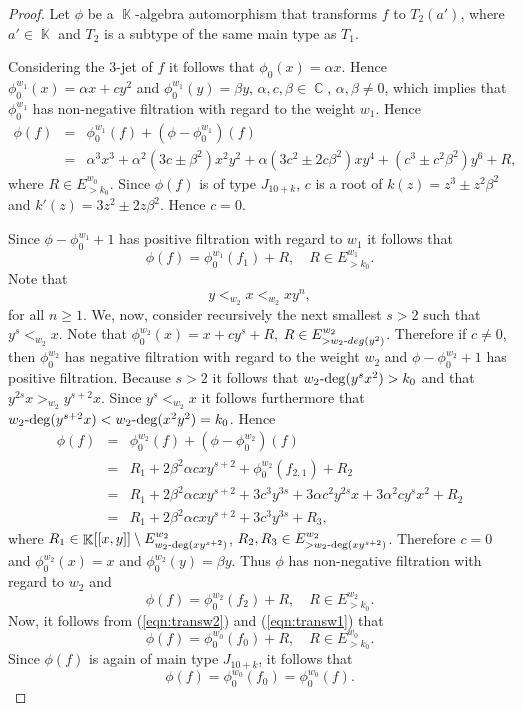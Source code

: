 \documentclass[noend]{amsproc}
\theoremstyle{definition}
\DeclareMathOperator{\C}{\mathbb{C}}
\DeclareMathOperator{\K}{\mathbb{K}}
\DeclareMathOperator{\dash}{\!\textnormal{-}\!}
\begin{document}
\begin{proof}
Let $\phi$ be a $\K$-algebra automorphism that transforms $f$ to $T_2(a')$,
where $a'\in\K$ and $T_2$ is a subtype of the same main type as $T_1$.

Considering the $3$-jet of $f$ it follows that $\phi_0(x)=\alpha x$. Hence
$\phi_0^{w_1}(x)=\alpha x+cy^2$ and $\phi_0^{w_1}(y)=\beta y$,
$\alpha,c,\beta\in\C$, $\alpha,\beta\neq 0$, which implies that $\phi^{w_1}_0$
has non-negative filtration with regard to the weight $w_1$. Hence
\begin{eqnarray*}
\phi(f)&=&\phi^{w_1}_0(f)+(\phi-\phi^{w_1}_0)(f)\\
&=&\alpha^3x^3+\alpha^2(3c\pm\beta^2)x^2y^2+\alpha(3c^2\pm2 c\beta^2)xy^4
+(c^3\pm c^2\beta^2)y^6+R,
\end{eqnarray*}
where $R\in E^{w_0}_{>k_0}$. Since $\phi(f)$ is of type $J_{10+k}$, $c$ is a
root of $k(z)=z^3\pm z^2\beta^2$ and $k'(z)=3z^2\pm2 z\beta^2$. Hence $c=0$.

Since $\phi-\phi_0^{w_1}+1$ has positive filtration with regard to $w_1$ it
follows that
\begin{equation}\label{eqn:transw2}
\phi(f) = \phi_0^{w_1}(f_1) + R,\quad R\in E^{w_1}_{>k_0}.
\end{equation}
Note that
\begin{equation}\label{eqn:orderw1}
y<_{w_2}x<_{w_2}xy^n,
\end{equation}
for all $n\ge 1$. We, now, consider recursively the next smallest $s>2$ such
that $y^s<_{w_2}x$. Note that $\phi_0^{w_2}(x)=x+cy^s+R$,
$R\in E^{w_2}_{>w_2\dash deg(y^2)}$. Therefore if $c\neq 0$, then
$\phi_0^{w_2}$ has negative filtration with regard to the weight $w_2$ and
$\phi-\phi_0^{w_2}+1$ has positive filtration. Because $s>2$ it follows that
$w_2\dash\deg(y^sx^2)>k_0$ and that $y^{2s}x>_{w_2}y^{s+2}x$. Since
$y^s<_{w_2}x$ it follows furthermore that
$w_2\dash\deg(y^{s+2}x)<w_2\dash\deg(x^2y^2)=k_0$. Hence
\begin{eqnarray*}
\phi(f) &=& \phi_0^{w_2}(f)+(\phi-\phi_0^{w_2})(f)\\
&=& R_1+2\beta^2\alpha c xy^{s+2}+\phi_0^{w_2}(f_{2,1})+R_2\\
&=&R_1+2\beta^2\alpha c xy^{s+2}+ 3 c^3y^{3s}+ 3\alpha c^2y^{2s}x
+3\alpha^2 cy^sx^2+R_2\\
&=&R_1+2\beta^2\alpha c xy^{s+2}+ 3c^3y^{3s}+R_3,
\end{eqnarray*}
where $R_1\in\K[[x,y]]\setminus E^{w_2}_{w_2\dash\deg(xy^{s+2})}$,
$R_2, R_3\in E^{w_2}_{>w_2\dash\deg(xy^{s+2})}$. Therefore $c=0$ and
$\phi_0^{w_2}(x)=x$ and $\phi_0^{w_2}(y)=\beta y$. Thus $\phi$ has non-negative
filtration with regard to $w_2$ and
\begin{equation}\label{eqn:transw1}
\phi(f) = \phi_0^{w_2}(f_2)+R,\quad R\in E^{w_2}_{>k_0}.
\end{equation}
Now, it follows from (\ref{eqn:transw2}) and (\ref{eqn:transw1}) that
\begin{equation*}
\phi(f) = \phi_0^{w_0}(f_0)+R,\quad R\in E^{w_0}_{>k_0}.
\end{equation*}
Since $\phi(f)$ is again of main type $J_{10+k}$, it follows that
\begin{equation*}
\phi(f) = \phi_0^{w_0}(f_0)=\phi_0^{w_0}(f).
\end{equation*}


\end{proof}
\end{document}
